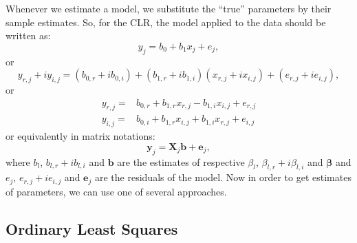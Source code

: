 \documentclass[
]{book}
\begin{document}
Whenever we estimate a model, we substitute the ``true'' parameters by their sample estimates. So, for the CLR, the model applied to the data should be written as:
\begin{equation}
    y_j = b_0 + b_1 x_j + e_j,
    \label{eq:SimpleCLRComplexEstimated}
\end{equation}
or
\begin{equation}
    y_{r,j}+i y_{i,j} = (b_{0,r} + i b_{0,i}) + (b_{1,r} + i b_{1,i}) (x_{r,j}+i x_{i,j}) + (e_{r,j} + i e_{i,j}),
    \label{eq:SimpleCLREstimated}
\end{equation}
or
\begin{equation}
    \begin{aligned}
        y_{r,j} = & b_{0,r} + b_{1,r} x_{r,j} - b_{1,i} x_{i,j} + e_{r,j} \\
        y_{i,j} = & b_{0,i} + b_{1,r} x_{i,j} + b_{1,i} x_{r,j} + e_{i,j}
    \end{aligned}
    \label{eq:SimpleCLRSystemEstimated}
\end{equation}
or equivalently in matrix notations:
\begin{equation}
    \mathbf{y}_j = \mathbf{X}_j \boldsymbol{b} + \boldsymbol{e}_j ,
    \label{eq:SimpleCLRSystemVector03Estimated}
\end{equation}
where \(b_{l}\), \(b_{l,r}+ib_{l,i}\) and \(\boldsymbol{b}\) are the estimates of respective \(\beta_l\), \(\beta_{l,r} + i \beta_{l,i}\) and \(\boldsymbol{\beta}\) and \(e_j\), \(e_{r,j} + i e_{i,j}\) and \(\boldsymbol{e}_j\) are the residuals of the model. Now in order to get estimates of parameters, we can use one of several approaches.

\hypertarget{ordinary-least-squares}{%
\subsection{Ordinary Least Squares}\label{ordinary-least-squares}}
\end{document}
